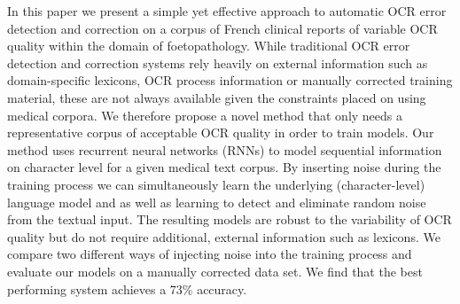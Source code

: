 In this paper we present a simple yet effective approach to automatic OCR error detection and correction on a corpus of French clinical reports of variable OCR quality within the domain of foetopathology. While traditional OCR error detection and correction systems rely heavily on external information such as domain-specific lexicons, OCR process information or manually corrected training material, these are not always available given the constraints placed on using medical corpora. We therefore propose a novel method that only needs a representative corpus of acceptable OCR quality in order to train models. Our method uses recurrent neural networks (RNNs) to model sequential information on character level for a given medical text corpus. By inserting noise during the training process we can simultaneously learn the underlying (character-level) language model and as well as learning to detect and eliminate random noise from the textual input. The resulting models are robust to the variability of OCR quality but do not require additional, external information such as lexicons. We compare two different ways of injecting noise into the training process and evaluate our models on a manually corrected data set. We find that the best performing system achieves a 73\% accuracy.
